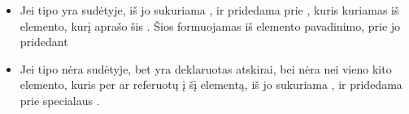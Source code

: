 \documentclass[letterpaper,10pt,lithuanian]{sphinxmanual}
\begin{document}
\begin{itemize}
\item {} 
\sphinxAtStartPar
Jei {\hyperref[\detokenize{schemos/xsd:xsd-simpletype}]{}} tipo {\hyperref[\detokenize{schemos/xsd:xsd-element}]{}} yra {\hyperref[\detokenize{schemos/xsd:xsd-complextype}]{}} sudėtyje,
iš jo sukuriama {\hyperref[\detokenize{formatas:property}]{}}, ir pridedama prie {\hyperref[\detokenize{formatas:model}]{}}, kuris kuriamas iš elemento, kurį
aprašo šis {\hyperref[\detokenize{schemos/xsd:xsd-complextype}]{}}. Šios {\hyperref[\detokenize{dimensijos:property.source}]{}} formuojamas iš elemento pavadinimo,
prie jo pridedant 

\item {} 
\sphinxAtStartPar
Jei {\hyperref[\detokenize{schemos/xsd:xsd-simpletype}]{}} tipo {\hyperref[\detokenize{schemos/xsd:xsd-element}]{}} nėra {\hyperref[\detokenize{schemos/xsd:xsd-complextype}]{}} sudėtyje, bet yra
deklaruotas atskirai, bei nėra nei vieno kito elemento, kuris per  ar  referuotų
į šį elementą, iš jo sukuriama {\hyperref[\detokenize{formatas:property}]{}}, ir pridedama prie specialaus
 {\hyperref[\detokenize{formatas:model}]{}}.

\end{itemize}
\end{document}
